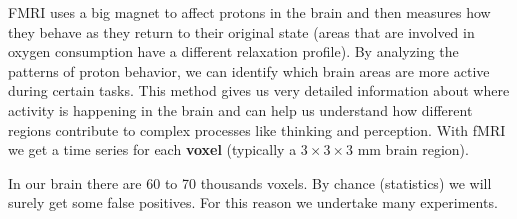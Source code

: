 FMRI uses a big magnet to affect protons in the brain and then measures how they behave as they return to their original state (areas that are involved in oxygen consumption have a different relaxation profile).
By analyzing the patterns of proton behavior, we can identify which brain areas are more active during certain tasks.
This method gives us very detailed information about where activity is happening in the brain and can help us understand how different regions contribute to complex processes like thinking and perception.
With fMRI we get a time series for each \textbf{voxel} (typically a $3\times3\times3$ mm brain region).


In our brain there are 60 to 70 thousands voxels. By chance (statistics) we will surely get some false positives. For this reason we undertake many experiments.

